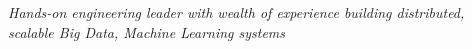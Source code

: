 \begin{cvparagraph}

  \vspace{4mm}
  \emph{Hands-on engineering leader with wealth of experience building distributed, scalable Big Data, Machine Learning systems}

\end{cvparagraph}
